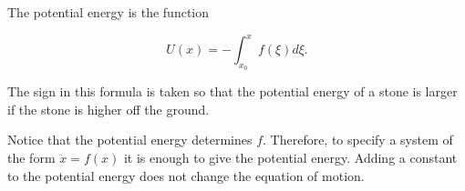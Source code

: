 The potential energy is the function

$$U(x) = - \int_{x_0}^{x} f(\xi) d\xi.$$

The sign in this formula is taken so that the potential energy of a stone is larger if the stone is higher off the ground.

Notice that the potential energy determines $f$. Therefore, to specify a system of the form $\ddot{x} = f(x)$ it is enough to give the potential energy. Adding a constant to the potential energy does not change the equation of motion.
